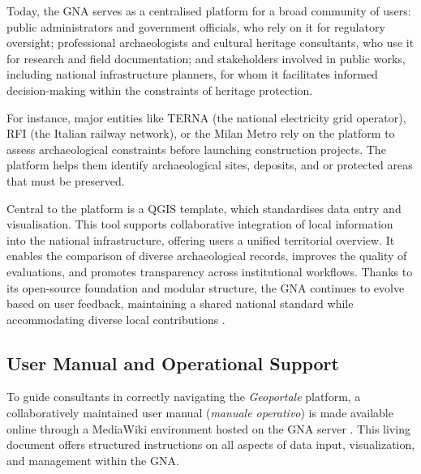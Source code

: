 \begin{spacing}{1.5}
Today, the GNA serves as a centralised platform for a broad community of users: public administrators and government officials, who rely on it for regulatory oversight; professional archaeologists and cultural heritage consultants, who use it for research and field documentation; and stakeholders involved in public works, including national infrastructure planners, for whom it facilitates informed decision-making within the constraints of heritage protection.

For instance, major entities like TERNA (the national electricity grid operator), RFI (the Italian railway network), or the Milan Metro rely on the platform to assess archaeological constraints before launching construction projects. The platform helps them identify archaeological sites, deposits, and or protected areas that must be preserved.

Central to the platform is a QGIS template, which standardises data entry and visualisation. This tool supports collaborative integration of local information into the national infrastructure, offering users a unified territorial overview. It enables the comparison of diverse archaeological records, improves the quality of evaluations, and promotes transparency across institutional workflows. Thanks to its open-source foundation and modular structure, the GNA continues to evolve based on user feedback, maintaining a shared national standard while accommodating diverse local contributions \citep{calandra_il_2023, boi_il_2023}.

\subsection{User Manual and Operational Support}\label{sec:gna_manual}
To guide consultants in correctly navigating the \textit{Geoportale} platform, a collaboratively maintained user manual (\textit{manuale operativo}) is made available online through a MediaWiki environment hosted on the GNA server \citep{gna_wiki_2024}. This living document offers structured instructions on all aspects of data input, visualization, and management within the GNA.


\end{spacing}
